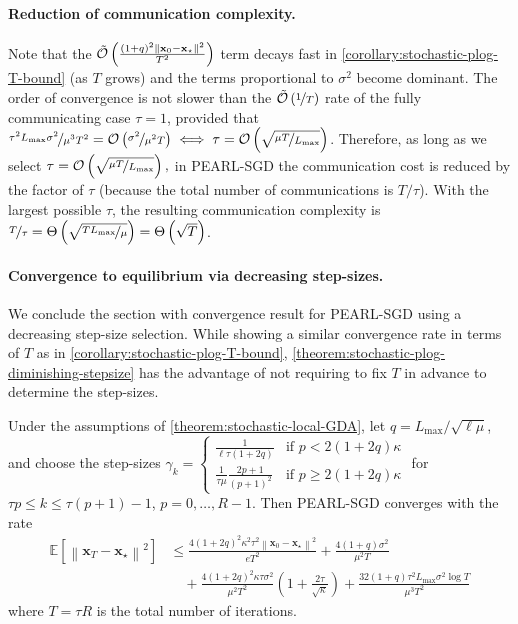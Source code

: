 \documentclass{article}
\newcommand{\algname}[1]{{\color{PineGreen}\sf  #1}\xspace}
\newcommand{\vx}{{\mathbf{x}}}
\newcommand{\cO}{{\mathcal{O}}}
\newcommand{\sqnorm}[1]{\left\| #1 \right\|^2}
\newcommand{\abbvname}{\algname{PEARL-SGD}}
\theoremstyle{plain}
\theoremstyle{remark}
\begin{document}
\paragraph{Reduction of communication complexity.}
Note that the $\Tilde{\cO} \left( \frac{(1+q)^2 \sqnorm{\vx_0 - \vx_\star}}{T^2} \right)$ term decays fast in \cref{corollary:stochastic-plog-T-bound} (as $T$ grows) and the terms proportional to $\sigma^2$ become dominant.
The order of convergence is not slower than the $\Tilde{\cO}\left(\nicefrac{1}{T}\right)$ rate of the fully communicating case $\tau = 1$, provided that $\nicefrac{\tau^2 L_{\mathrm{max}} \sigma^2}{\mu^3 T^2} = \cO\left( \nicefrac{\sigma^2}{\mu^2 T} \right) \iff \tau = \cO \left( \sqrt{\nicefrac{\mu T}{L_{\mathrm{max}}}} \right)$.
Therefore, as long as we select $\tau = \cO \left( \sqrt{\nicefrac{\mu T}{L_{\mathrm{max}}}} \right),$ in \abbvname the communication cost is reduced by the factor of $\tau$ (because the total number of communications is $T/\tau$).
With the largest possible $\tau$, the resulting communication complexity is $\nicefrac{T}{\tau} = \Theta \left( \sqrt{\nicefrac{TL_{\mathrm{max}}}{\mu}} \right) = \Theta \left( \sqrt{T} \right)$.

\paragraph{Convergence to equilibrium via decreasing step-sizes.} We conclude the section with convergence result for \abbvname using a decreasing step-size selection.
While showing a similar convergence rate in terms of $T$ as in \cref{corollary:stochastic-plog-T-bound}, \cref{theorem:stochastic-plog-diminishing-stepsize} has the advantage of not requiring to fix $T$ in advance to determine the step-sizes.

\begin{theorem}
\label{theorem:stochastic-plog-diminishing-stepsize}
Under the assumptions of \cref{theorem:stochastic-local-GDA}, let $q = L_\mathrm{max}/\sqrt{\ell\mu}$, and choose the step-sizes $\gamma_k = \begin{cases}
    \frac{1}{\ell\tau (1+2q)} & \text{if } p < 2(1+2q)\kappa \\
    \frac{1}{\tau \mu} \frac{2p+1}{(p+1)^2} & \text{if } p \ge 2(1+2q)\kappa
\end{cases}$ for $\tau p \le k \le \tau(p+1)-1$, $p=0,\dots,R-1$. 
Then \abbvname converges with the rate
\begin{align*}
    \mathbb{E}\left[ \sqnorm{\vx_T - \vx_\star} \right] & \le \frac{4(1+2q)^2 \kappa^2 \tau^2 \sqnorm{\vx_0 - \vx_\star}}{e T^2} + \frac{4(1+q)\sigma^2}{\mu^2 T} \\
    & \quad + \frac{4(1+2q)^2 \kappa\tau\sigma^2}{\mu^2 T^2} \left( 1 + \frac{2\tau}{\sqrt{\kappa}} \right) + \frac{32(1+q) \tau^2 L_{\mathrm{max}} \sigma^2 \log T}{\mu^3 T^2}
\end{align*}
where $T = \tau R$ is the total number of iterations.
\end{theorem}
\end{document}
